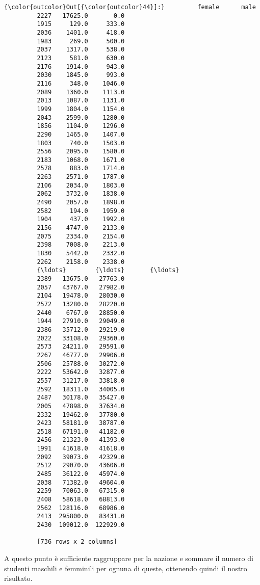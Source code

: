 \documentclass[11pt]{article}
\begin{document}
\begin{Verbatim}[commandchars=\\\{\}]
{\color{outcolor}Out[{\color{outcolor}44}]:}         female      male
         2227   17625.0       0.0
         1915     129.0     333.0
         2036    1401.0     418.0
         1983     269.0     500.0
         2037    1317.0     538.0
         2123     581.0     630.0
         2176    1914.0     943.0
         2030    1845.0     993.0
         2116     348.0    1046.0
         2089    1360.0    1113.0
         2013    1087.0    1131.0
         1999    1804.0    1154.0
         2043    2599.0    1280.0
         1856    1104.0    1296.0
         2290    1465.0    1407.0
         1803     740.0    1503.0
         2556    2095.0    1580.0
         2183    1068.0    1671.0
         2578     883.0    1714.0
         2263    2571.0    1787.0
         2106    2034.0    1803.0
         2062    3732.0    1838.0
         2490    2057.0    1898.0
         2582     194.0    1959.0
         1904     437.0    1992.0
         2156    4747.0    2133.0
         2075    2334.0    2154.0
         2398    7008.0    2213.0
         1830    5442.0    2332.0
         2262    2158.0    2338.0
         {\ldots}        {\ldots}       {\ldots}
         2389   13675.0   27763.0
         2057   43767.0   27982.0
         2104   19478.0   28030.0
         2572   13280.0   28220.0
         2440    6767.0   28850.0
         1944   27910.0   29049.0
         2386   35712.0   29219.0
         2022   33108.0   29360.0
         2573   24211.0   29591.0
         2267   46777.0   29906.0
         2506   25788.0   30272.0
         2222   53642.0   32877.0
         2557   31217.0   33818.0
         2592   18311.0   34005.0
         2487   30178.0   35427.0
         2005   47898.0   37634.0
         2332   19462.0   37780.0
         2423   58181.0   38787.0
         2518   67191.0   41182.0
         2456   21323.0   41393.0
         1991   41618.0   41618.0
         2092   39073.0   42329.0
         2512   29070.0   43606.0
         2485   36122.0   45974.0
         2038   71382.0   49604.0
         2259   70063.0   67315.0
         2408   58618.0   68813.0
         2562  128116.0   68986.0
         2413  295800.0   83431.0
         2430  109012.0  122929.0
         
         [736 rows x 2 columns]
\end{Verbatim}
            
    A questo punto è sufficiente raggruppare per la nazione e sommare il
numero di studenti maschili e femminili per ognuna di queste, ottenendo
quindi il nostro risultato.
\end{document}
